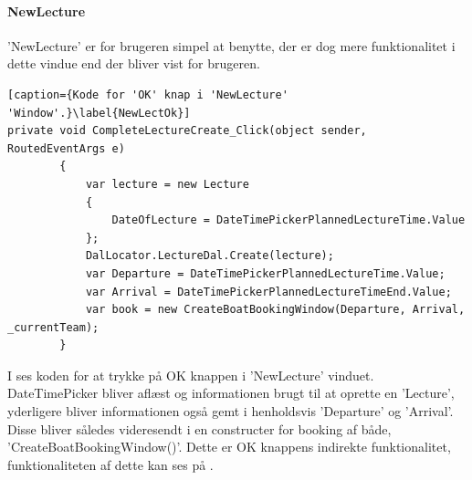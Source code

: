 \paragraph{NewLecture}
'NewLecture' er for brugeren simpel at benytte, der er dog mere funktionalitet i dette vindue end der bliver vist for brugeren.

\begin{lstlisting}[caption={Kode for 'OK' knap i 'NewLecture' 'Window'.}\label{NewLectOk}]
private void CompleteLectureCreate_Click(object sender, RoutedEventArgs e)
        {
            var lecture = new Lecture
            {
                DateOfLecture = DateTimePickerPlannedLectureTime.Value
            };
            DalLocator.LectureDal.Create(lecture);
            var Departure = DateTimePickerPlannedLectureTime.Value;
            var Arrival = DateTimePickerPlannedLectureTimeEnd.Value;
            var book = new CreateBoatBookingWindow(Departure, Arrival, _currentTeam);
        }
\end{lstlisting}
I  ses koden for at trykke på OK knappen i 'NewLecture' vinduet. DateTimePicker bliver aflæst og informationen brugt til at oprette en 'Lecture', yderligere bliver informationen også gemt i henholdsvis 'Departure' og 'Arrival'. Disse bliver således videresendt i en constructer for booking af både, 'CreateBoatBookingWindow()'. Dette er OK knappens indirekte funktionalitet, funktionaliteten af dette kan ses på .

